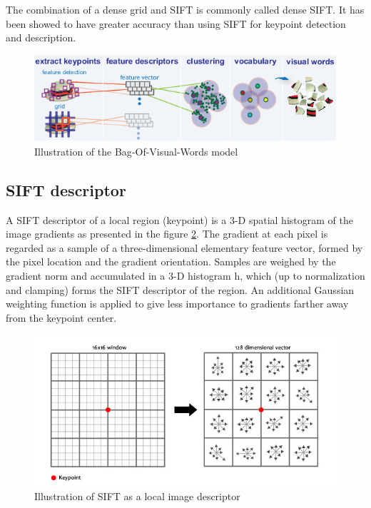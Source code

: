 The combination of a dense grid and SIFT is commonly called dense SIFT. It has been showed to have greater accuracy than using SIFT for keypoint detection and description.

\begin{figure}
    \centering
    \includegraphics[scale=0.9]{img/bow.png}
    \caption{Illustration of the Bag-Of-Visual-Words model}
    \label{fig:bow_process}
\end{figure}

\subsection{SIFT descriptor}

A SIFT descriptor of a local region (keypoint) is a 3-D spatial histogram of the image gradients as presented in the figure \ref{fig:sift_descriptor}. The gradient at each pixel is regarded as a sample of a three-dimensional elementary feature vector, formed by the pixel location and the gradient orientation. Samples are weighed by the gradient norm and accumulated in a 3-D histogram h, which (up to normalization and clamping) forms the SIFT descriptor of the region. An additional Gaussian weighting function is applied to give less importance to gradients farther away from the keypoint center.

\begin{figure}
    \centering
    \includegraphics[scale=0.5]{img/sift_descriptor.jpg}
    \caption{Illustration of SIFT as a local image descriptor}
    \label{fig:sift_descriptor}
\end{figure}

